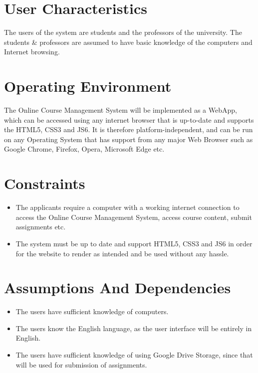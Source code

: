 \documentclass[12pt, a4]{report}
\begin{document}

\section{User Characteristics}
The users of the system are students and the professors of the university.
The students \& professors are assumed to have basic knowledge of the computers and Internet browsing.


\section{Operating Environment}
The Online Course Management System will be implemented as a WebApp, which can be accessed using any internet browser that is up-to-date and supports the HTML5, CSS3 and JS6. It is therefore platform-independent, and can be run on any Operating System that has support from any major Web Browser such as Google Chrome, Firefox, Opera, Microsoft Edge etc.

\section{Constraints}
\begin{itemize}
    \item The applicants require a computer with a working internet connection to access the Online Course Management System, access course content, submit assignments etc.
    \item The system must be up to date and support HTML5, CSS3 and JS6 in order for the website to render as intended and be used without any hassle.
\end{itemize}


\section{Assumptions And Dependencies}
\begin{itemize}
    \item The users have sufficient knowledge of computers.
    \item The users know the English language, as the user interface will be entirely in English.
    \item The users have sufficient knowledge of using Google Drive Storage, since that will be used for submission of assignments.
\end{itemize}
\end{document}
